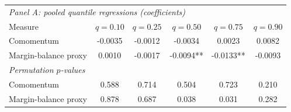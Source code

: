 \begingroup\footnotesize\setlength{\tabcolsep}{2.5pt}
\begin{tabular}{lccccc}
\toprule
\multicolumn{6}{l}{\textit{Panel A: pooled quantile regressions (coefficients)}} \\
Measure & $q=0.10$ & $q=0.25$ & $q=0.50$ & $q=0.75$ & $q=0.90$ \\
\midrule
Comomentum & -0.0035 & -0.0012 & -0.0034 & 0.0023 & 0.0082 \\
Margin-balance proxy & 0.0010 & -0.0017 & -0.0094** & -0.0133** & -0.0093 \\
\midrule
\multicolumn{6}{l}{\textit{Permutation $p$-values}} \\
Comomentum & 0.588 & 0.714 & 0.504 & 0.723 & 0.210 \\
Margin-balance proxy & 0.878 & 0.687 & 0.038 & 0.031 & 0.282 \\
\bottomrule
\end{tabular}

